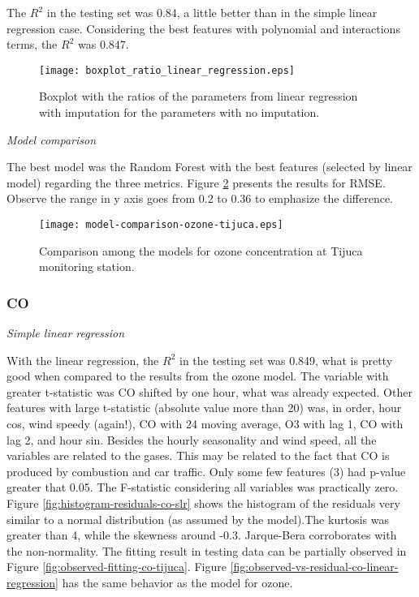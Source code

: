 The $R^2$ in the testing set was 0.84, a little better than in the simple
linear regression case. Considering the best features with polynomial and
interactions terms, the $R^2$ was 0.847.

\begin{figure}
    \centering
    \texttt{[image: boxplot\_ratio\_linear\_regression.eps]}
    \caption{Boxplot with the ratios of the parameters from linear regression
    with imputation for the parameters with no imputation.}
    \label{fig:boxplot-linear-regression}
\end{figure}

\vspace{2mm}

{\em Model comparison} 

\vspace{2mm}

The best model was the Random Forest with the best features (selected by linear model) regarding the three metrics. Figure
\ref{fig:model-comparison-ozone-tijuca} presents the results for RMSE. Observe
the range in y axis goes from 0.2 to 0.36 to emphasize the difference.

\begin{figure}
    \centering
    \texttt{[image: model-comparison-ozone-tijuca.eps]}
    \caption{Comparison among the models for ozone concentration at Tijuca monitoring station.}
    \label{fig:model-comparison-ozone-tijuca}
\end{figure}

\subsubsection{CO}

{\em Simple linear regression}

\vspace{2mm}

With the linear regression, the $R^2$ in the testing set was 0.849,
what is pretty good when compared to the results from the ozone model. The variable with greater t-statistic
was CO shifted by one hour, what was already expected. Other features with
large t-statistic (absolute value more than
20) was, in
order, hour cos, wind speedy (again!), CO with 24 moving average, O3 with lag
1, CO with lag
2, and hour sin. Besides the hourly seasonality and wind speed, all the
variables are related to the gases. This may be related to the fact that CO is
produced by combustion and car traffic. Only some few features (3) had p-value
greater that 0.05. The F-statistic considering all variables was practically zero. Figure \ref{fig:histogram-residuals-co-slr} shows
the histogram of the residuals very similar to a normal distribution (as
assumed by the model).The kurtosis was greater than 4, while the skewness around
-0.3. Jarque-Bera corroborates with the non-normality. The fitting result in testing data can be
partially observed in Figure \ref{fig:observed-fitting-co-tijuca}.  Figure
\ref{fig:observed-vs-residual-co-linear-regression} has the same behavior as
the model for ozone.  

